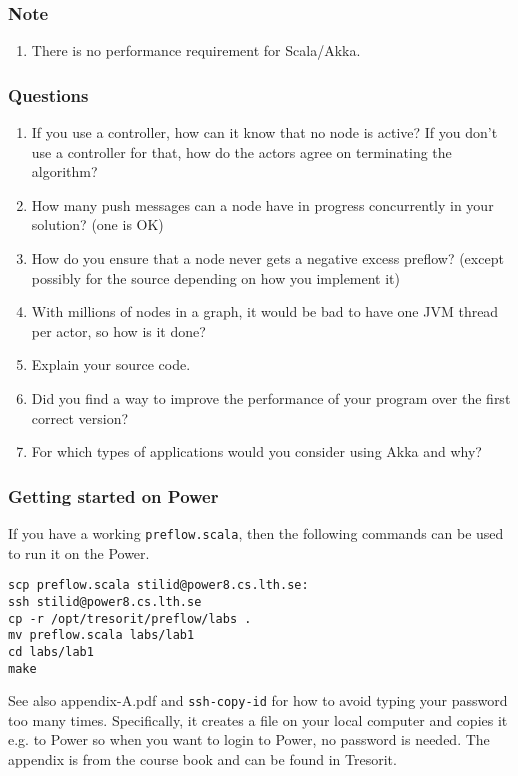 \documentclass{forsete}
\begin{document}
\subsubsection*{Note}
\begin{enumerate}
\item There is no performance requirement for Scala/Akka.
\end{enumerate}

\subsubsection*{Questions}
\begin{enumerate}
\item If you use a controller, how can it know that no node is active? If you don't use a controller for that, how do the actors agree on
terminating the algorithm?
\item How many push messages can a node have in progress concurrently in your solution? (one is OK)
\item How do you ensure that a node never gets a negative excess preflow? (except possibly for the source depending on how you implement it)
\item With millions of nodes in a graph, it would be bad to have one JVM thread per actor, so how is it done?
\item Explain your source code.
\item Did you find a way to improve the performance of your program over the first correct version?
\item For which types of applications would you consider using Akka and why?
\end{enumerate}

\subsubsection*{Getting started on Power}
If you have a working \verb!preflow.scala!, then the following commands can be used to run it on the Power.
\begin{verbatim}
scp preflow.scala stilid@power8.cs.lth.se:
ssh stilid@power8.cs.lth.se
cp -r /opt/tresorit/preflow/labs .
mv preflow.scala labs/lab1
cd labs/lab1
make
\end{verbatim}

See also appendix-A.pdf and \verb!ssh-copy-id! for how to avoid typing your password too many times. Specifically, it creates a file on your local computer and copies it e.g. to Power so when you want to login to Power, no password is needed. The appendix is from the course book and can be found in Tresorit.
\end{document}
